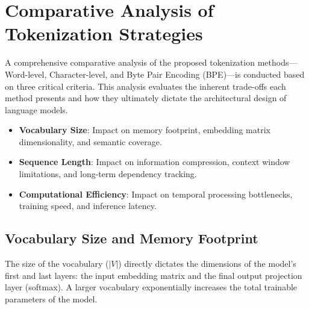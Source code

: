 \section{Comparative Analysis of Tokenization Strategies}
A comprehensive comparative analysis of the proposed tokenization methods—Word-level, Character-level, and Byte Pair Encoding (BPE)—is conducted based on three critical criteria. This analysis evaluates the inherent trade-offs each method presents and how they ultimately dictate the architectural design of language models.

\begin{itemize}
    \item \textbf{Vocabulary Size}: Impact on memory footprint, embedding matrix dimensionality, and semantic coverage.
    \item \textbf{Sequence Length}: Impact on information compression, context window limitations, and long-term dependency tracking.
    \item \textbf{Computational Efficiency}: Impact on temporal processing bottlenecks, training speed, and inference latency.
\end{itemize}

\subsection{Vocabulary Size and Memory Footprint}
The size of the vocabulary ($|V|$) directly dictates the dimensions of the model's first and last layers: the input embedding matrix and the final output projection layer (softmax). A larger vocabulary exponentially increases the total trainable parameters of the model.


